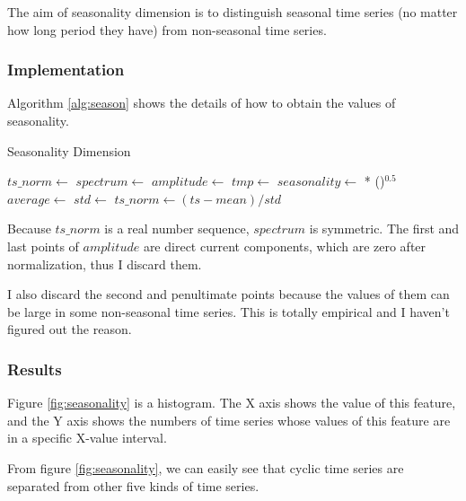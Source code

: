 \documentclass[a4paper]{article}
\begin{document}
The aim of seasonality dimension is to distinguish seasonal time series (no matter how long period they have) from non-seasonal time series.
\subsubsection{Implementation}
Algorithm \ref{alg:season} shows the details of how to obtain the values of seasonality.

\begin{algorithm}
\caption{Seasonality Dimension} \label{alg:season}
\begin{algorithmic}[1] 
	\State $ts\_norm \gets$ 
	\State $spectrum \gets$ 
	\State $amplitude \gets$ 
	\State $tmp \gets$ 
	\State $seasonality \gets$  ()$^{0.5}$
	\State
		\State $average \gets$ 
		\State $std \gets$ 
		\State $ts\_norm \gets (ts - mean) / std$
		\State {}
	\EndFunction
\end{algorithmic}
\end{algorithm}

Because $ts\_norm$ is a real number sequence, $spectrum$ is symmetric. The first and last points of $amplitude$ are direct current components, which are zero after normalization, thus I discard them. 

I also discard the second and penultimate points because the values of them can be large in some non-seasonal time series. This is totally empirical and I haven't figured out the reason.

\subsubsection{Results}
Figure \ref{fig:seasonality} is a histogram. The X axis shows the value of this feature, and the Y axis shows the numbers of time series whose values of this feature are in a specific X-value interval.

From figure \ref{fig:seasonality}, we can easily see that cyclic time series are separated from other five kinds of time series.
\end{document}
